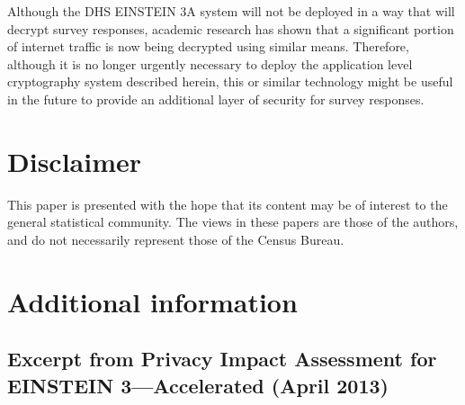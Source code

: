 \documentclass[fleqn,10pt]{wlscirep}
\begin{document}
Although the DHS EINSTEIN 3A system will not be deployed in a way that
will decrypt survey responses, academic research has shown that a
significant portion of internet traffic is now being decrypted using
similar means. Therefore, although it is no longer urgently necessary
to deploy the application level cryptography system described herein,
this or similar technology might be useful in the future to provide an
additional layer of security for survey responses. 

\section{Disclaimer}
This paper is presented with the hope that its content may be of interest to the general statistical community. The views in these papers are those of the authors, and do not necessarily represent those of the Census Bureau.
\section{Additional information}

\subsection{Excerpt from Privacy Impact Assessment for EINSTEIN 3---Accelerated (April 2013)}
\end{document}
